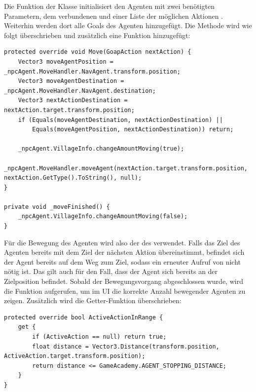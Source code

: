 Die Funktion  der Klasse  initialisiert den Agenten mit zwei benötigten Parametern, dem verbundenen  und einer Liste der möglichen Aktionen . Weiterhin werden dort alle Goals des Agenten hinzugefügt.
Die Methode  wird wie folgt überschrieben und zusätzlich eine Funktion  hinzugefügt:

\begin{minipage}{\linewidth}
\begin{lstlisting}[linewidth=16.4cm, label=lst:move_goap_agent, caption=Implementierung der Funktion \inlinecode{Move} in der Klasse \inlinecode{NpcGoapAgent}, xleftmargin=1cm]
protected override void Move(GoapAction nextAction) {
    Vector3 moveAgentPosition = _npcAgent.MoveHandler.NavAgent.transform.position;
    Vector3 moveAgentDestination = _npcAgent.MoveHandler.NavAgent.destination;
    Vector3 nextActionDestination = nextAction.target.transform.position;
    if (Equals(moveAgentDestination, nextActionDestination) ||
        Equals(moveAgentPosition, nextActionDestination)) return;

    _npcAgent.VillageInfo.changeAmountMoving(true);
    _npcAgent.MoveHandler.moveAgent(nextAction.target.transform.position, nextAction.GetType().ToString(), null);
}

private void _moveFinished() {
    _npcAgent.VillageInfo.changeAmountMoving(false);
}
\end{lstlisting}
\end{minipage}
Für die Bewegung des Agenten wird also der  des  verwendet. Falls das Ziel des Agenten bereits mit dem Ziel der nächsten Aktion übereinstimmt, befindet sich der Agent bereits auf dem Weg zum Ziel, sodass ein erneuter Aufruf von  nicht nötig ist. Das gilt auch für den Fall, dass der Agent sich bereits an der Zielposition befindet. Sobald der Bewegungsvorgang abgeschlossen wurde, wird die Funktion  aufgerufen, um im UI die korrekte Anzahl bewegender Agenten zu zeigen.
Zusätzlich wird die Getter-Funktion  überschrieben:

\begin{minipage}{\linewidth}
\begin{lstlisting}[linewidth=16.4cm, label=lst:activeactioninrange_goapagent, caption=Implementierung der Getter-Funktion \inlinecode{ActiveActionInRange} in der Klasse \inlinecode{NpcGoapAgent}, xleftmargin=1cm]
protected override bool ActiveActionInRange {
    get {
        if (ActiveAction == null) return true;
        float distance = Vector3.Distance(transform.position, ActiveAction.target.transform.position);
        return distance <= GameAcademy.AGENT_STOPPING_DISTANCE;
    }
}
\end{lstlisting}
\end{minipage}

